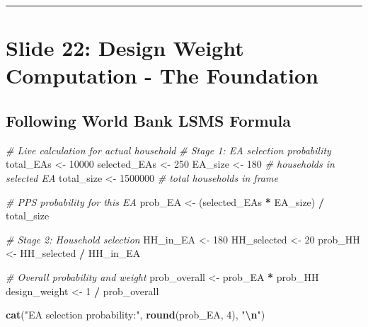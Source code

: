 \documentclass[
]{article}
\newenvironment{Shaded}{\begin{snugshade}}{\end{snugshade}}
\newcommand{\CommentTok}[1]{\textcolor[rgb]{0.56,0.35,0.01}{\textit{#1}}}
\newcommand{\DecValTok}[1]{\textcolor[rgb]{0.00,0.00,0.81}{#1}}
\newcommand{\FunctionTok}[1]{\textcolor[rgb]{0.13,0.29,0.53}{\textbf{#1}}}
\newcommand{\NormalTok}[1]{#1}
\newcommand{\OtherTok}[1]{\textcolor[rgb]{0.56,0.35,0.01}{#1}}
\newcommand{\SpecialCharTok}[1]{\textcolor[rgb]{0.81,0.36,0.00}{\textbf{#1}}}
\newcommand{\StringTok}[1]{\textcolor[rgb]{0.31,0.60,0.02}{#1}}
\begin{document}
\begin{center}\rule{0.5\linewidth}{0.5pt}\end{center}

\section{Slide 22: Design Weight Computation - The
Foundation}\label{slide-22-design-weight-computation---the-foundation}

\subsection{Following World Bank LSMS
Formula}\label{following-world-bank-lsms-formula}

\begin{Shaded}
\begin{Highlighting}[]
\CommentTok{\# Live calculation for actual household}
\CommentTok{\# Stage 1: EA selection probability}
\NormalTok{total\_EAs }\OtherTok{\textless{}{-}} \DecValTok{10000}
\NormalTok{selected\_EAs }\OtherTok{\textless{}{-}} \DecValTok{250}
\NormalTok{EA\_size }\OtherTok{\textless{}{-}} \DecValTok{180}  \CommentTok{\# households in selected EA}
\NormalTok{total\_size }\OtherTok{\textless{}{-}} \DecValTok{1500000}  \CommentTok{\# total households in frame}

\CommentTok{\# PPS probability for this EA}
\NormalTok{prob\_EA }\OtherTok{\textless{}{-}}\NormalTok{ (selected\_EAs }\SpecialCharTok{*}\NormalTok{ EA\_size) }\SpecialCharTok{/}\NormalTok{ total\_size}

\CommentTok{\# Stage 2: Household selection}
\NormalTok{HH\_in\_EA }\OtherTok{\textless{}{-}} \DecValTok{180}
\NormalTok{HH\_selected }\OtherTok{\textless{}{-}} \DecValTok{20}
\NormalTok{prob\_HH }\OtherTok{\textless{}{-}}\NormalTok{ HH\_selected }\SpecialCharTok{/}\NormalTok{ HH\_in\_EA}

\CommentTok{\# Overall probability and weight}
\NormalTok{prob\_overall }\OtherTok{\textless{}{-}}\NormalTok{ prob\_EA }\SpecialCharTok{*}\NormalTok{ prob\_HH}
\NormalTok{design\_weight }\OtherTok{\textless{}{-}} \DecValTok{1} \SpecialCharTok{/}\NormalTok{ prob\_overall}

\FunctionTok{cat}\NormalTok{(}\StringTok{"EA selection probability:"}\NormalTok{, }\FunctionTok{round}\NormalTok{(prob\_EA, }\DecValTok{4}\NormalTok{), }\StringTok{"}\SpecialCharTok{\textbackslash{}n}\StringTok{"}\NormalTok{)}
\end{Highlighting}
\end{Shaded}
\end{document}
